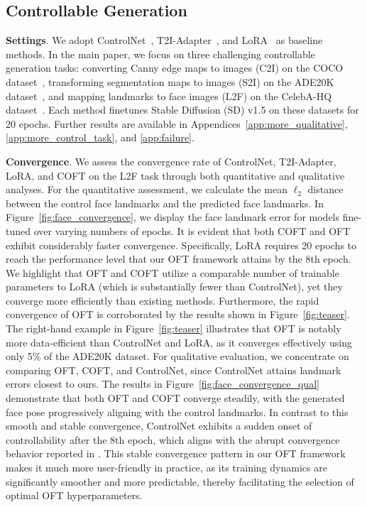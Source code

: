 \subsection{Controllable Generation}

\textbf{Settings}. We adopt ControlNet~\cite{zhang2023adding}, T2I-Adapter~\cite{mou2023t2i}, and LoRA~\cite{hulora2022} as baseline methods. In the main paper, we focus on three challenging controllable generation tasks: converting Canny edge maps to images (C2I) on the COCO dataset~\cite{lin2014microsoft}, transforming segmentation maps to images (S2I) on the ADE20K dataset~\cite{zhou2017scene}, and mapping landmarks to face images (L2F) on the CelebA-HQ dataset~\cite{karras2018progressive,xia2021tedigan}. Each method finetunes Stable Diffusion (SD) v1.5 on these datasets for 20 epochs. Further results are available in Appendices~\ref{app:more_qualitative}, \ref{app:more_control_task}, and \ref{app:failure}.

\textbf{Convergence}. We assess the convergence rate of ControlNet, T2I-Adapter, LoRA, and COFT on the L2F task through both quantitative and qualitative analyses. For the quantitative assessment, we calculate the mean $\ell_2$ distance between the control face landmarks and the predicted face landmarks. In Figure~\ref{fig:face_convergence}, we display the face landmark error for models fine-tuned over varying numbers of epochs. It is evident that both COFT and OFT exhibit considerably faster convergence. Specifically, LoRA requires 20 epochs to reach the performance level that our OFT framework attains by the 8th epoch. We highlight that OFT and COFT utilize a comparable number of trainable parameters to LoRA (which is substantially fewer than ControlNet), yet they converge more efficiently than existing methods. Furthermore, the rapid convergence of OFT is corroborated by the results shown in Figure~\ref{fig:teaser}. The right-hand example in Figure~\ref{fig:teaser} illustrates that OFT is notably more data-efficient than ControlNet and LoRA, as it converges effectively using only 5\% of the ADE20K dataset. For qualitative evaluation, we concentrate on comparing OFT, COFT, and ControlNet, since ControlNet attains landmark errors closest to ours. The results in Figure~\ref{fig:face_convergence_qual} demonstrate that both OFT and COFT converge steadily, with the generated face pose progressively aligning with the control landmarks. In contrast to this smooth and stable convergence, ControlNet exhibits a sudden onset of controllability after the 8th epoch, which aligns with the abrupt convergence behavior reported in \cite{zhang2023adding}. This stable convergence pattern in our OFT framework makes it much more user-friendly in practice, as its training dynamics are significantly smoother and more predictable, thereby facilitating the selection of optimal OFT hyperparameters.

